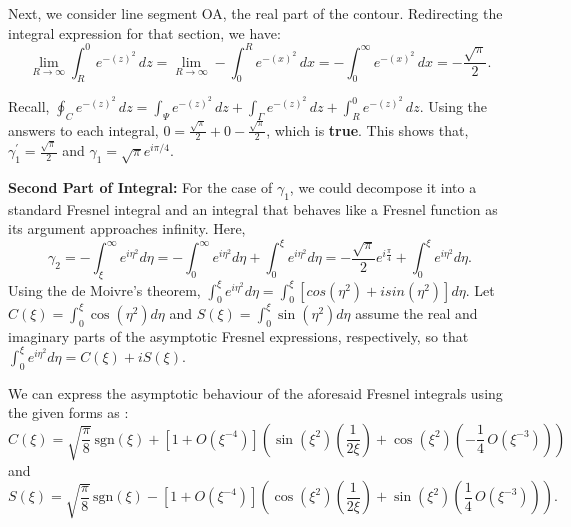 \documentclass{article}
\begin{document}
Next, we consider line segment OA, the real part of the contour. Redirecting the integral expression for that section, we have:
\begin{equation}
 \lim_{{R \to \infty}} \int_{R}^{0} e^{-(z)^{2}} \, dz = \lim_{{R \to \infty}} - \int_{0}^{R} e^{-(x)^{2}} \, dx = - \int_{0}^{\infty} e^{-(x)^{2}} \, dx = -\frac{\sqrt{\pi}}{2}.
\end{equation}

Recall, $\oint_{C} e^{-(z)^{2}} \, dz = \int_{\Psi} e^{-(z)^{2}} \, dz + \int_{\Gamma} e^{-(z)^{2}} \, dz + \int_{R}^{0} e^{-(z)^{2}} \, dz.$ Using the answers to each integral, $0 = \frac{\sqrt{\pi}}{2} + 0 - \frac{\sqrt{\pi}}{2}$, which is \textbf{true}. This shows that, $\gamma_{1}^{'} = \frac{\sqrt{\pi}}{2}$ and $\gamma_{1} = \sqrt{\pi}e^{i\pi/4}$.

\vspace{3pt}

\textbf{Second Part of Integral:}
For the case of $\gamma_{1}$, we could decompose it into a standard Fresnel integral and an integral that behaves like a Fresnel function as its argument approaches infinity. Here,
\begin{equation}
\gamma_{2} = - \int_{\xi}^{\infty}e^{i\eta^{2}}d\eta = -\int_{0}^{\infty}e^{i\eta^{2}}d\eta + \int_{0}^{\xi}e^{i\eta^{2}}d\eta = -\frac{\sqrt{\pi}}{2}e^{i\frac{\pi}{4}} + \int_{0}^{\xi}e^{i\eta^{2}}d\eta.
\end{equation}
Using the de Moivre's theorem, $\int_{0}^{\xi}e^{i\eta^{2}}d\eta = \int_{0}^{\xi}[cos(\eta^{2}) + isin(\eta^{2})]d\eta$. Let $C(\xi) = \int_{0}^{\xi}\cos(\eta^{2})d\eta$ and $S(\xi) =  \int_{0}^{\xi}\sin(\eta^{2})d\eta$ assume the real and imaginary parts of the asymptotic Fresnel expressions, respectively, so that $\int_{0}^{\xi}e^{i\eta^{2}}d\eta = C(\xi) + iS(\xi)$.

\vspace{5pt}

We can express the asymptotic behaviour of the aforesaid Fresnel integrals using the given forms as \cite{abramowitz1968handbook}\cite{enwiki:1181389148}\cite{wolfram-alpha-notebook}: 
\begin{equation}
    C(\xi) = \sqrt{\frac{\pi}{8}}\,\text{sgn}(\xi) + \left[1 + O\left(\xi^{-4}\right)\right]\left(\sin(\xi^2)\left(\frac{1}{2\xi}\right) + \cos(\xi^2)\left(-\frac{1}{4}\,O\left(\xi^{-3}\right)\right)\right)
\end{equation}
and
\begin{equation}
   S(\xi) = \sqrt{\frac{\pi}{8}}\,\text{sgn}(\xi) - \left[1 + O\left(\xi^{-4}\right)\right]\left(\cos(\xi^2)\left(\frac{1}{2\xi}\right) + \sin(\xi^2)\left(\frac{1}{4}\,O\left(\xi^{-3}\right)\right)\right).
\end{equation}
\end{document}
